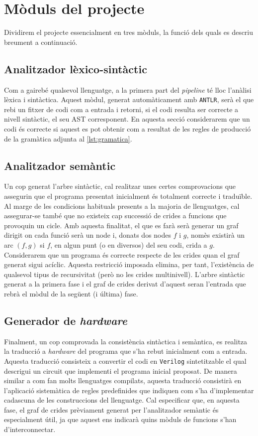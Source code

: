 
\section{Mòduls del projecte}

Dividirem el projecte essencialment en tres mòduls, la funció dels quals es 
descriu breument a continuació.

\subsection{Analitzador lèxico-sintàctic}
Com a gairebé qualsevol llenguatge, a la primera part del \textit{pipeline} té 
lloc l'anàlisi lèxica i sintàctica. Aquest mòdul, generat automàticament amb 
\texttt{ANTLR}, serà el que rebi un fitxer de codi com a entrada i retorni, si 
el codi resulta ser correcte a nivell sintàctic, el seu AST corresponent. En 
aquesta secció considerarem que un codi és correcte si aquest es pot 
obtenir com a resultat de les regles de producció de la gramàtica adjunta al 
\autoref{lst:gramatica}.

\subsection{Analitzador semàntic}
Un cop generat l'arbre sintàctic, cal realitzar unes certes comprovacions que 
assegurin que el programa presentat inicialment és totalment correcte i 
traduïble. Al marge de les condicions habituals presents a la majoria de 
llenguatges, cal assegurar-se també que no existeix cap successió de crides a 
funcions que provoquin un cicle. Amb aquesta finalitat, el que es farà serà 
generar un graf dirigit on cada funció serà un node i, donats dos nodes \(f\) 
i \(g\), nomès existirà un arc \((f,g)\) si \(f\), en algun punt (o en 
diversos) del seu codi, crida a \(g\). Considerarem que un programa és correcte 
respecte de les crides quan el graf generat sigui acíclic. Aquesta restricció 
imposada elimina, per tant, l'existència de qualsevol tipus de recursivitat 
(però no les crides multinivell). L'arbre sintàctic generat a la primera fase 
i el graf de crides derivat d'aquest seran l'entrada que rebrà el mòdul de la 
següent (i última) fase.

\subsection{Generador de \textit{hardware}}
Finalment, un cop comprovada la consistència sintàctica i semàntica, es 
realitza la traducció a \textit{hardware} del programa que s'ha rebut 
inicialment com a entrada. Aquesta traducció consisteix a convertir el codi 
en \texttt{Verilog} sintetitzable el qual descrigui un circuit que implementi 
el programa inicial proposat. De manera similar a com fan molts llenguatges 
compilats, aquesta traducció consistirà en l'aplicació sistemàtica de regles 
predefinides que indiquen com s'ha d'implementar cadascuna de les construccions 
del llenguatge. Cal especificar que, en aquesta fase, el graf de crides 
prèviament generat per l'analitzador semàntic és especialment útil, ja que 
aquest ens indicarà quins mòduls de funcions s'han d'interconnectar.

